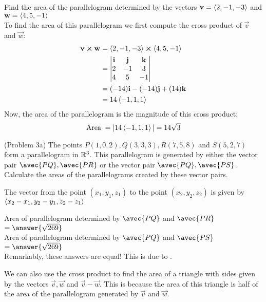 \documentclass[handout]{ximera}
\begin{document}
\begin{example}[Example 3]
Find the area of the parallelogram determined by the vectors $\mathbf v = \left\langle 2, -1, -3\right\rangle$ and $\mathbf w = \left\langle 4, 5, -1\right\rangle$\\
To find the area of this parallelogram we first compute the cross product of $\vec v$ and $\vec w$:
\begin{align*}
\mathbf v \boldsymbol\times \mathbf w &= \left\langle 2, -1, -3\right\rangle \boldsymbol\times \left\langle 4, 5, -1\right\rangle\\
                    &=  \begin{vmatrix}
\mathbf{i} & \mathbf{j} & \mathbf{k}\\
2 & -1 & 3\\
4 & 5 & -1
\end{vmatrix}\\
&= (-14)\mathbf{i} - (-14)\mathbf{j} + (14)\mathbf{k}\\
&= 14 \left\langle -1, 1, 1\right\rangle
\end{align*}
Now, the area of the parallelogram is the magnitude of this cross product:
\[
\text{Area} \; = |14\left\langle -1, 1, 1\right\rangle| = 14\sqrt 3
\]
\end{example}

\begin{problem}(Problem 3a) The points $P(1,0,2), Q(3,3,3), R(7, 5, 8)$ and $S(5, 2, 7)$ form a parallelogram in $\mathbb R^3$.
This parallelogram is generated by either the vector pair $\avec{PQ}, \avec{PR}$ or the vector pair $\avec{PQ}, \avec{PS}$.
Calculate the areas of the parallelograms created by these vector pairs.\\
\begin{hint}
The vector from the point $(x_1, y_1, z_1)$ to the point $(x_2, y_2, z_2)$ is given by $\left\langle x_2-x_1, y_2-y_1, z_2-z_1\right\rangle$
\end{hint}
Area of parallelogram determined by $\avec{PQ}$ and $\avec{PR}$  $=\answer{\sqrt{269}}$\\
Area of parallelogram determined by $\avec{PQ}$ and $\avec{PS}$ $=\answer{\sqrt{269}}$\\
Remarkably, these answers are equal!  This is due to .
\end{problem}



We can also use the cross product to find the area of a triangle with sides given by the vectors $\vec{v}, \vec{w}$ and $\vec{v}-\vec{w}$. 
This is because the area of this triangle is half of the area of the parallelogram generated by $\vec{v}$ and $\vec{w}$.
\end{document}
